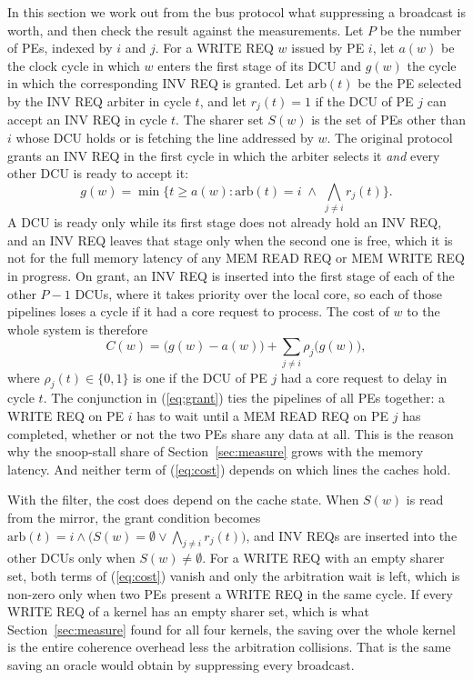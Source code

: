 \documentclass[conference]{IEEEtran}
\begin{document}
In this section we work out from the bus protocol what suppressing a
broadcast is worth, and then check the result against the measurements. Let
$P$ be the number of PEs, indexed by $i$ and $j$. For a WRITE REQ $w$ issued
by PE $i$, let $a(w)$ be the clock cycle in which $w$ enters the first stage
of its DCU and $g(w)$ the cycle in which the corresponding INV REQ is granted.
Let $\mathrm{arb}(t)$ be the PE selected by the INV REQ arbiter in cycle $t$,
and let $r_j(t) = 1$ if the DCU of PE $j$ can accept an INV REQ in cycle $t$.
The sharer set $S(w)$ is the set of PEs other than $i$ whose DCU holds or is
fetching the line addressed by $w$. The original protocol grants an INV REQ
in the first cycle in which the arbiter selects it \emph{and} every other DCU
is ready to accept it:
\begin{equation}
g(w) = \min\Big\{t \ge a(w) : \mathrm{arb}(t) = i \;\wedge\; \textstyle\bigwedge_{j \ne i} r_j(t)\Big\}.
\label{eq:grant}
\end{equation}
A DCU is ready only while its first stage does not already hold an INV REQ,
and an INV REQ leaves that stage only when the second one is free, which it is
not for the full memory latency of any MEM READ REQ or MEM WRITE REQ in
progress. On grant, an INV REQ is inserted into the first stage of each of the
other $P{-}1$ DCUs, where it takes priority over the local core, so each of
those pipelines loses a cycle if it had a core request to process. The cost of
$w$ to the whole system is therefore
\begin{equation}
C(w) = \big(g(w) - a(w)\big) + \sum_{j \ne i} \rho_j\big(g(w)\big),
\label{eq:cost}
\end{equation}
where $\rho_j(t) \in \{0, 1\}$ is one if the DCU of PE $j$ had a core request
to delay in cycle $t$. The
conjunction in (\ref{eq:grant}) ties the pipelines of all PEs together: a
WRITE REQ on PE $i$ has to wait until a MEM READ REQ on PE $j$ has completed,
whether or not the two PEs share any data at all. This is the reason why the
snoop-stall share of Section~\ref{sec:measure} grows with the memory latency.
And neither term of (\ref{eq:cost}) depends on which lines the caches hold.

With the filter, the cost does depend on the cache state. When $S(w)$ is read
from the mirror, the grant condition becomes $\mathrm{arb}(t) = i \wedge
\big(S(w) = \emptyset \vee \bigwedge\nolimits_{j \ne i} r_j(t)\big)$, and
INV REQs are inserted into the other DCUs only when $S(w) \ne \emptyset$. For
a WRITE REQ with an empty sharer set, both terms of (\ref{eq:cost}) vanish
and only the arbitration wait is left, which is non-zero only when two PEs
present a WRITE REQ in the same cycle. If every WRITE REQ of a kernel has an
empty sharer set, which is what Section~\ref{sec:measure} found for all four
kernels, the saving over the whole kernel is the entire coherence overhead
less the arbitration collisions. That is the same saving an oracle would
obtain by suppressing every broadcast.
\end{document}
